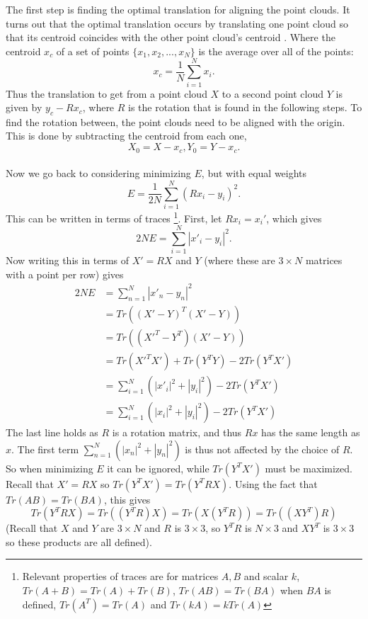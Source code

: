 \documentclass[12pt,a4paper]{article}
\begin{document}
    The first step is finding the optimal translation for aligning the point clouds. It turns out that the optimal translation occurs by translating one point cloud so that its centroid coincides with the other point cloud's centroid \cite{kavraki2009geometric}. Where the centroid $x_c$ of a set of points $\{x_1, x_2, ..., x_N\}$ is the average over all of the points:
    \[
    x_c = \frac{1}{N}\sum^N_{i=1} x_i.
    \]
    Thus the translation to get from a point cloud $X$ to a second point cloud $Y$ is given by $y_c - Rx_c$, where $R$ is the rotation that is found in the following steps. To find the rotation between, the point clouds need to be aligned with the origin. This is done by subtracting the centroid from each one, 
    \[
    X_0=X-x_c, Y_0=Y-x_c.
    \]
    \\
    Now we go back to considering minimizing $E$, but with equal weights
    \[
    E = \frac{1}{2N} \sum^N_{i=1} (Rx_i - y_i)^2.
    \]
    This can be written in terms of traces \cite{kavraki2009geometric}\footnote{Relevant properties of traces are for matrices $A,B$ and scalar $k$, $Tr(A+B) = Tr(A) + Tr(B)$, $Tr(AB)=Tr(BA)$ when $BA$ is defined, $Tr(A^T)=Tr(A)$ and $Tr(kA)=kTr(A)$}. First, let $Rx_i = x_i'$, which gives
    \[
    2NE = \sum^N_{i=1} |x'_i - y_i|^2.
    \]    
    Now writing this in terms of $X' = RX$ and $Y$ (where these are $3 \times N$ matrices with a point per row) gives 
    \begin{align*}
    2NE &= \sum^N_{n=1} |x'_n - y_n|^2 \\
    &= Tr((X'-Y)^T(X'-Y)) \\
    &= Tr((X'^T-Y^T)(X'-Y)) \\
    &= Tr(X'^TX') + Tr(Y^TY) - 2Tr(Y^TX') \\
    &= \sum^N_{i=1} (|x'_i|^2 + |y_i|^2) - 2 Tr(Y^TX') \\
    &= \sum^N_{i=1} (|x_i|^2 + |y_i|^2) - 2 Tr(Y^TX')
    \end{align*}
    The last line holds as $R$ is a rotation matrix, and thus $Rx$ has the same length as $x$. The first term $\sum^N_{n=1} (|x_n|^2 + |y_n|^2)$ is thus not affected by the choice of $R$. So when minimizing $E$ it can be ignored, while $Tr(Y^TX')$ must be maximized. Recall that $X'=RX$ so $Tr(Y^TX') = Tr(Y^TRX)$. Using the fact that $Tr(AB) = Tr(BA)$, this gives
    \[
    Tr(Y^TRX) = Tr((Y^TR)X) = Tr(X(Y^TR)) = Tr((XY^T)R)
    \]
    (Recall that $X$ and $Y$ are $3 \times N$ and $R$ is $3 \times 3$, so $Y^TR$ is $N \times 3$ and $XY^T$ is $3 \times 3$ so these products are all defined).
     
\end{document}
